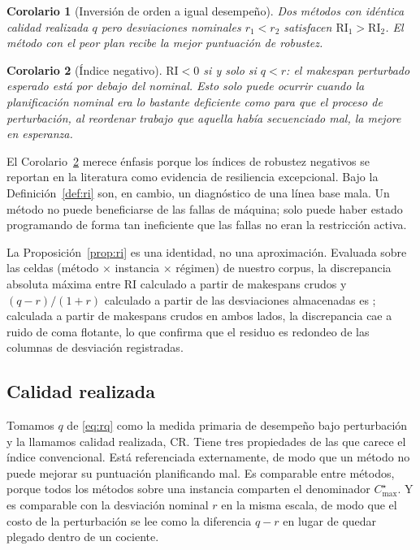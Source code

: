 \documentclass[a4paper,fleqn]{cas-sc}
\newtheorem{corollary}{Corolario}
\newcommand{\Cmax}{C_{\max}}
\newcommand{\RI}{\mathrm{RI}}
\newcommand{\RQ}{\mathrm{CR}}
\begin{document}
\begin{corollary}[Inversión de orden a igual desempeño]\label{cor:inv}
Dos métodos con idéntica calidad realizada $q$ pero desviaciones nominales
$r_1<r_2$ satisfacen $\RI_1>\RI_2$. El método con el peor plan recibe la mejor
puntuación de robustez.
\end{corollary}

\begin{corollary}[Índice negativo]\label{cor:neg}
$\RI<0$ si y solo si $q<r$: el makespan perturbado esperado está \emph{por
debajo} del nominal. Esto solo puede ocurrir cuando la planificación nominal era
lo bastante deficiente como para que el proceso de perturbación, al reordenar
trabajo que aquella había secuenciado mal, la mejore en esperanza.
\end{corollary}

El Corolario~\ref{cor:neg} merece énfasis porque los índices de robustez
negativos se reportan en la literatura como evidencia de resiliencia
excepcional. Bajo la Definición~\ref{def:ri} son, en cambio, un diagnóstico de
una línea base mala. Un método no puede beneficiarse de las fallas de máquina;
solo puede haber estado programando de forma tan ineficiente que las fallas no
eran la restricción activa.

La Proposición~\ref{prop:ri} es una identidad, no una aproximación. Evaluada
sobre las \PropCells{} celdas (método $\times$ instancia $\times$ régimen) de
nuestro corpus, la discrepancia absoluta máxima entre $\RI$ calculado a partir
de makespans crudos y $(q-r)/(1+r)$ calculado a partir de las desviaciones
almacenadas es \PropErr{}; calculada a partir de makespans crudos en ambos lados,
la discrepancia cae a ruido de coma flotante, lo que confirma que el residuo es
redondeo de las columnas de desviación registradas.

\subsection{Calidad realizada}

Tomamos $q$ de \eqref{eq:rq} como la medida primaria de desempeño bajo
perturbación y la llamamos calidad realizada, $\RQ$. Tiene tres propiedades de
las que carece el índice convencional. Está referenciada externamente, de modo
que un método no puede mejorar su puntuación planificando mal. Es comparable
entre métodos, porque todos los métodos sobre una instancia comparten el
denominador $\Cmax^{\star}$. Y es comparable con la desviación nominal $r$ en la
misma escala, de modo que el costo de la perturbación se lee como la diferencia
$q-r$ en lugar de quedar plegado dentro de un cociente.
\end{document}
